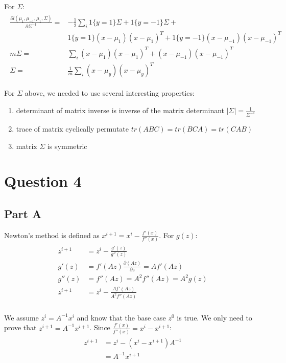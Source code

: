 \documentclass[11pt]{article}
\begin{document}
For $\Sigma$:
\begin{align}
	\begin{split}
		\frac{\partial l(\mu_1, \mu_{-1}, \mu_{1}, \Sigma)}{\partial \Sigma^{-1}} =& -\frac{1}{2}\sum_{i} 
		1\{y=1\}\Sigma + 1\{y=-1\}\Sigma + \\
		&1\{y=1\}(x-\mu_1)(x-\mu_1)^T + 1\{y=-1\}(x-\mu_{-1})(x-\mu_{-1})^T \\
		m\Sigma =& \sum_{i}(x-\mu_1)(x-\mu_1)^T + (x-\mu_{-1})(x-\mu_{-1})^T \\
		\Sigma =& \frac{1}{m}\sum_{i}(x-\mu_y)(x-\mu_y)^T 
	\end{split}
\end{align}

For $\Sigma$ above, we needed to use several interesting properties:
\begin{enumerate}
	\item determinant of matrix inverse is inverse of the matrix determinant $|\Sigma|= \frac{1}{\Sigma^{-1}}$
	\item trace of matrix cyclically permutate $tr(ABC)=tr(BCA)=tr(CAB)$
	\item matrix $\Sigma$ is symmetric
\end{enumerate}

\section*{Question 4}
\subsection*{Part A}
Newton's method is defined as $x^{i+1}=x^{i}-\frac{f'(x)}{f''(x)}$.
For $g(z)$:
\begin{align}
	\begin{split}
		z^{i+1} &= z^{i}-\frac{g'(z)}{g''(z)} \\
		g'(z) &= f'(Az)\frac{\partial (Az)}{\partial z}=Af'(Az) \\
	  g''(z) &= f''(Az) = A^2f''(Az) = A^2g(z) \\
		z^{i+1} &= z^{i} - \frac{Af'(Az)}{A^2f''(Az)} \\
	\end{split}
\end{align}

We assume $z^{i}=A^{-1}x^{i}$ and know that the base case $z^{0}$ is true. We only need to prove
that $z^{i+1}=A^{-1}x^{i+1}$. Since $\frac{f'(x)}{f''(x)}=x^{i}-x^{i+1}$:
\begin{align}
	\begin{split}
		z^{i+1} &= z^{i} - (x^{i}-x^{i+1})A^{-1} \\
		        &= A^{-1}x^{i+1}
	\end{split}
\end{align}
\end{document}
